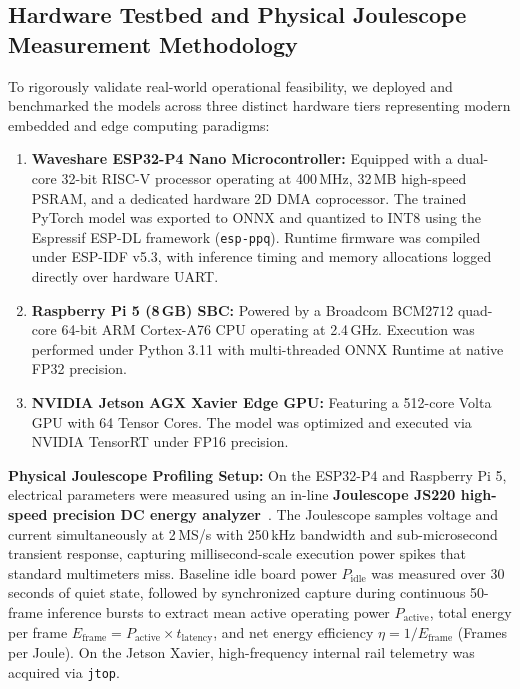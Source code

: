 \documentclass[journal,twoside,web]{ieeecolor}
\begin{document}
\subsection{Hardware Testbed and Physical Joulescope Measurement Methodology}
To rigorously validate real-world operational feasibility, we deployed and benchmarked the models across three distinct hardware tiers representing modern embedded and edge computing paradigms:
\begin{enumerate}
    \item \textbf{Waveshare ESP32-P4 Nano Microcontroller:} Equipped with a dual-core 32-bit RISC-V processor operating at 400\,MHz, 32\,MB high-speed PSRAM, and a dedicated hardware 2D DMA coprocessor. The trained PyTorch model was exported to ONNX and quantized to INT8 using the Espressif ESP-DL framework (\texttt{esp-ppq}). Runtime firmware was compiled under ESP-IDF v5.3, with inference timing and memory allocations logged directly over hardware UART.
    \item \textbf{Raspberry Pi 5 (8\,GB) SBC:} Powered by a Broadcom BCM2712 quad-core 64-bit ARM Cortex-A76 CPU operating at 2.4\,GHz. Execution was performed under Python 3.11 with multi-threaded ONNX Runtime at native FP32 precision.
    \item \textbf{NVIDIA Jetson AGX Xavier Edge GPU:} Featuring a 512-core Volta GPU with 64 Tensor Cores. The model was optimized and executed via NVIDIA TensorRT under FP16 precision.
\end{enumerate}

\textbf{Physical Joulescope Profiling Setup:} On the ESP32-P4 and Raspberry Pi 5, electrical parameters were measured using an in-line \textbf{Joulescope JS220 high-speed precision DC energy analyzer}~\cite{joulescope2024}. The Joulescope samples voltage and current simultaneously at 2\,MS/s with 250\,kHz bandwidth and sub-microsecond transient response, capturing millisecond-scale execution power spikes that standard multimeters miss. Baseline idle board power $P_{\text{idle}}$ was measured over 30 seconds of quiet state, followed by synchronized capture during continuous 50-frame inference bursts to extract mean active operating power $P_{\text{active}}$, total energy per frame $E_{\text{frame}} = P_{\text{active}} \times t_{\text{latency}}$, and net energy efficiency $\eta = 1 / E_{\text{frame}}$ (Frames per Joule). On the Jetson Xavier, high-frequency internal rail telemetry was acquired via \texttt{jtop}.
\end{document}
